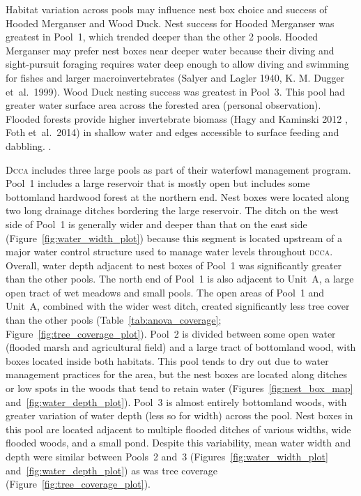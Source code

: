 
Habitat variation across pools may influence nest box choice and success of Hooded Merganser and Wood Duck.  Nest success for Hooded Merganser was greatest in Pool~1,  which trended deeper than the other 2 pools. Hooded Merganser may prefer nest boxes near deeper water because their diving and sight-pursuit foraging requires water deep enough to allow diving and swimming for fishes and larger macroinvertebrates (Salyer and Lagler 1940, K. M. Dugger et~al.~1999).  Wood Duck nesting success was greatest in Pool~3. This pool had greater water surface area across the forested area (personal observation). Flooded forests provide higher invertebrate biomass (Hagy and Kaminski 2012 , Foth et~al.~2014) in shallow water and edges accessible to surface feeding and dabbling. .

D\textsc{cca} includes three large pools as part of their waterfowl management program. Pool~1 includes a large reservoir that is mostly open but includes some bottomland hardwood forest at the northern end. Nest boxes were located along two long drainage ditches bordering the large reservoir. The ditch on the west side of Pool~1 is generally wider and deeper than that on the east side (Figure~\ref{fig:water_width_plot}) because this segment is located upstream of a major water control structure used to manage water levels throughout \textsc{dcca}. Overall, water depth adjacent to nest boxes of Pool~1 was significantly greater than the other pools. The north end of Pool~1 is also adjacent to Unit~A, a large open tract of wet meadows and small pools. The open areas of Pool~1 and Unit~A, combined with the wider west ditch, created significantly less tree cover than the other pools (Table~\ref{tab:anova_coverage}; Figure~\ref{fig:tree_coverage_plot}). Pool~2 is divided between some open water (flooded marsh and agricultural field) and a large tract of bottomland wood, with boxes located inside both habitats.  This pool tends to dry out due to water management practices for the area, but the nest boxes are located along ditches or low spots in the woods that tend to retain water (Figures~\ref{fig:nest_box_map} and~\ref{fig:water_depth_plot}).  Pool~3 is almost entirely bottomland woods, with greater variation of water depth (less so for width) across the pool. Nest boxes in this pool are located adjacent to multiple flooded ditches of various widths, wide flooded woods, and a small pond. Despite this variability, mean water width and depth were similar between Pools~2 and~3 (Figures~\ref{fig:water_width_plot} and~\ref{fig:water_depth_plot}) as was tree coverage (Figure~\ref{fig:tree_coverage_plot}). 

